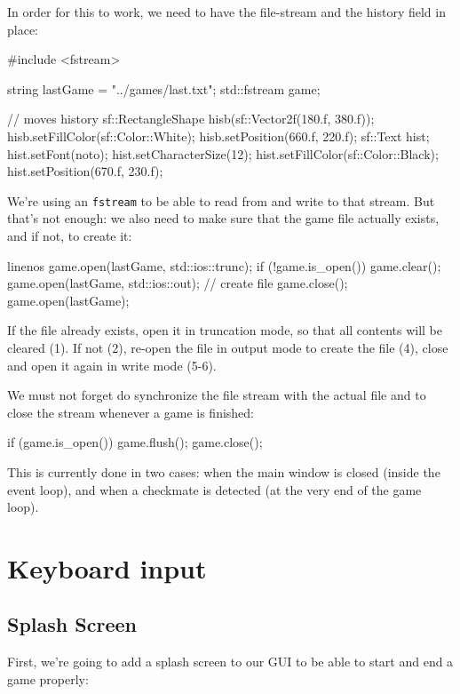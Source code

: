In order for this to work, we need to have the file-stream and the history field in place:

\begin{cpp}
#include <fstream>

string lastGame = "../games/last.txt";
std::fstream game;

// moves history
sf::RectangleShape hisb(sf::Vector2f(180.f, 380.f));
hisb.setFillColor(sf::Color::White);
hisb.setPosition(660.f, 220.f);
sf::Text hist;
hist.setFont(noto);
hist.setCharacterSize(12);
hist.setFillColor(sf::Color::Black);
hist.setPosition(670.f, 230.f);
\end{cpp}

We're using an \texttt{fstream} to be able to read from and write to that stream.
But that's not enough: we also need to make sure that the game file actually exists,
and if not, to create it:

\begin{cpp*}{linenos}
game.open(lastGame, std::ios::trunc);
if (!game.is_open()) {
  game.clear();
  game.open(lastGame, std::ios::out); // create file
  game.close();
  game.open(lastGame);
}
\end{cpp*}

If the file already exists, open it in truncation mode, so that all contents will
be cleared (1).
If not (2), re-open the file in output mode to create the file (4), close and open
it again in write mode (5-6).

We must not forget do synchronize the file stream with the actual file and to close the
stream whenever a game is finished:

\begin{cpp}
if (game.is_open()) {
  game.flush();
  game.close();
}
\end{cpp}

This is currently done in two cases: when the main window is closed (inside the event loop),
and when a checkmate is detected (at the very end of the game loop).

\section{Keyboard input}
\subsection{Splash Screen}

First, we're going to add a splash screen to our GUI to be able to start and end a game properly:

